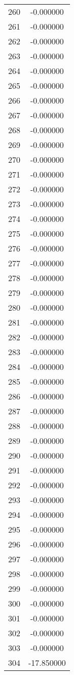 \documentclass[12pt]{article}
\begin{document}
\begin{longtable}{@{}cc@{}}
260 & -0.000000 \\
261 & -0.000000 \\
262 & -0.000000 \\
263 & -0.000000 \\
264 & -0.000000 \\
265 & -0.000000 \\
266 & -0.000000 \\
267 & -0.000000 \\
268 & -0.000000 \\
269 & -0.000000 \\
270 & -0.000000 \\
271 & -0.000000 \\
272 & -0.000000 \\
273 & -0.000000 \\
274 & -0.000000 \\
275 & -0.000000 \\
276 & -0.000000 \\
277 & -0.000000 \\
278 & -0.000000 \\
279 & -0.000000 \\
280 & -0.000000 \\
281 & -0.000000 \\
282 & -0.000000 \\
283 & -0.000000 \\
284 & -0.000000 \\
285 & -0.000000 \\
286 & -0.000000 \\
287 & -0.000000 \\
288 & -0.000000 \\
289 & -0.000000 \\
290 & -0.000000 \\
291 & -0.000000 \\
292 & -0.000000 \\
293 & -0.000000 \\
294 & -0.000000 \\
295 & -0.000000 \\
296 & -0.000000 \\
297 & -0.000000 \\
298 & -0.000000 \\
299 & -0.000000 \\
300 & -0.000000 \\
301 & -0.000000 \\
302 & -0.000000 \\
303 & -0.000000 \\
304 & -17.850000 \\

\end{longtable}
\end{document}
